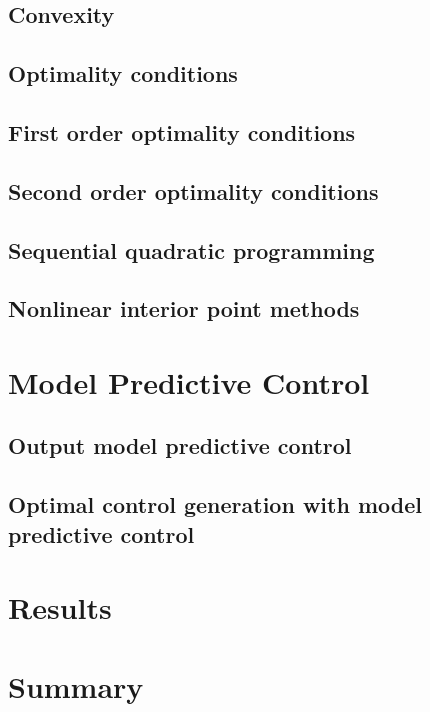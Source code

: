 \subsection{Convexity}

\subsection{Optimality conditions}

\subsection{First order optimality conditions}

\subsection{Second order optimality conditions}

\subsection{Sequential quadratic programming}

\subsection{Nonlinear interior point methods}


\section{Model Predictive Control}

\subsection{Output model predictive control}

\subsection{Optimal control generation with model predictive control}


\section{Results}


\section{Summary}

